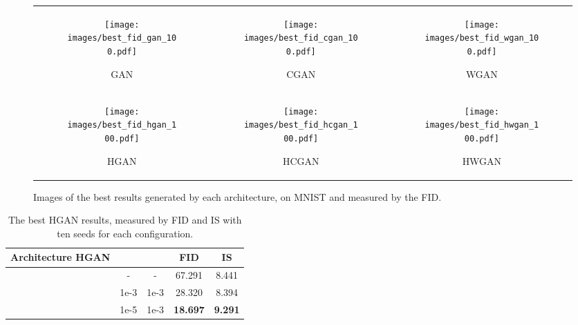 \documentclass[journal]{IEEEtran}
\begin{document}
 
\begin{figure*}[t]
    \centering
\begin{tabular}{c c c}
     \begin{subfigure}[b]{0.25\textwidth}
         \centering
         \texttt{[image: images/best\_fid\_gan\_100.pdf]}
         \caption{GAN}
         \label{fig:exp:mnist_gan}
     \end{subfigure}&
      \begin{subfigure}[b]{0.25\textwidth}
         \centering
         \texttt{[image: images/best\_fid\_cgan\_100.pdf]}
         \caption{CGAN}
         \label{fig:three sin x}
     \end{subfigure}&
     \begin{subfigure}[b]{0.25\textwidth}
         \centering
         \texttt{[image: images/best\_fid\_wgan\_100.pdf]}
         \caption{WGAN}
         \label{fig:three sin x}
     \end{subfigure}\\
     \begin{subfigure}[b]{0.25\textwidth}
         \centering
         \texttt{[image: images/best\_fid\_hgan\_100.pdf]}
         \caption{HGAN}
         \label{fig:three sin x}
     \end{subfigure}&
    \begin{subfigure}[b]{0.25\textwidth}
         \centering
         \texttt{[image: images/best\_fid\_hcgan\_100.pdf]}
         \caption{HCGAN}
         \label{fig:three sin x}
     \end{subfigure}&
    \begin{subfigure}[b]{0.25\textwidth}
         \centering
         \texttt{[image: images/best\_fid\_hwgan\_100.pdf]}
         \caption{HWGAN}
         \label{fig:three sin x}
     \end{subfigure}
\end{tabular}
\caption{Images of the best results generated by each architecture, on MNIST and measured by the FID.}
\end{figure*} 
 





\begin{table}[H]
  \centering
  \begin{tabular}{|c|c|c|c|c|}
  \hline
  Architecture HGAN&  && FID  & IS  \\
  \hline
  &-&-& 67.291 & 8.441\\
  \hline
  &1e-3&1e-3& 28.320 & 8.394\\
  \hline
  &1e-5&1e-3&\textbf{18.697}&\textbf{9.291}\\
  \hline
  \end{tabular}
  \caption{The best HGAN results, measured by FID and IS with ten seeds for each configuration.}
  \label{table_hgan}
\end{table}
\end{document}
